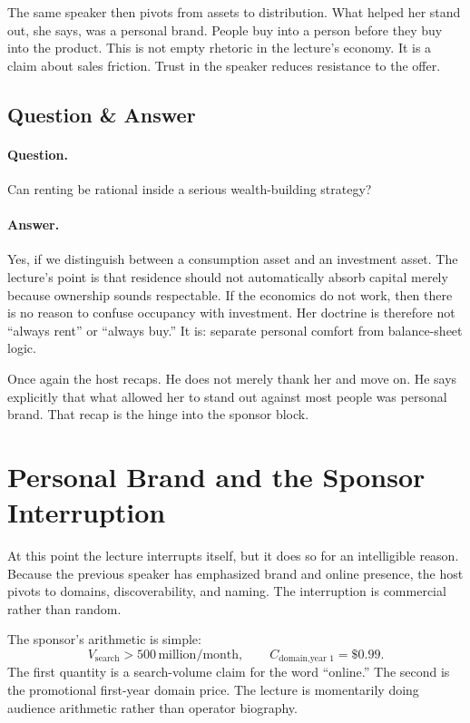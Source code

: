 The same speaker then pivots from assets to distribution. What helped her stand out, she says, was a personal brand. People buy into a person before they buy into the product. This is not empty rhetoric in the lecture's economy. It is a claim about sales friction. Trust in the speaker reduces resistance to the offer.

\subsection{Question \& Answer}

\paragraph{Question.} Can renting be rational inside a serious wealth-building strategy?

\paragraph{Answer.} Yes, if we distinguish between a consumption asset and an investment asset. The lecture's point is that residence should not automatically absorb capital merely because ownership sounds respectable. If the economics do not work, then there is no reason to confuse occupancy with investment. Her doctrine is therefore not ``always rent'' or ``always buy.'' It is: separate personal comfort from balance-sheet logic.

Once again the host recaps. He does not merely thank her and move on. He says explicitly that what allowed her to stand out against most people was personal brand. That recap is the hinge into the sponsor block.

\section{Personal Brand and the Sponsor Interruption}

At this point the lecture interrupts itself, but it does so for an intelligible reason. Because the previous speaker has emphasized brand and online presence, the host pivots to domains, discoverability, and naming. The interruption is commercial rather than random.

The sponsor's arithmetic is simple:
\begin{equation}
V_{\text{search}} > 500\,\text{million/month},\qquad
C_{\text{domain,year 1}} = \$0.99.
\end{equation}
The first quantity is a search-volume claim for the word ``online.'' The second is the promotional first-year domain price. The lecture is momentarily doing audience arithmetic rather than operator biography.

